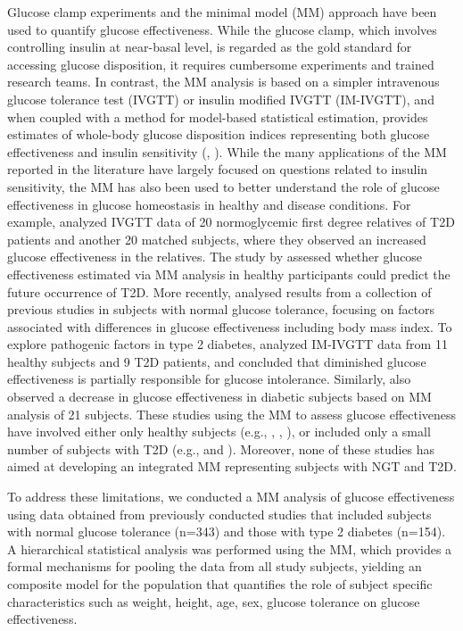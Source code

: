 \documentclass[utf8]{frontiersSCNS} %
\begin{document}
Glucose clamp experiments and the minimal model (MM) approach have been used to quantify glucose effectiveness. While the glucose clamp, which involves controlling insulin at near-basal level, is regarded as the gold standard for accessing glucose disposition, it requires cumbersome experiments and trained research teams. In contrast, the MM analysis is based on a simpler intravenous glucose tolerance test (IVGTT) or insulin modified IVGTT (IM-IVGTT), and when coupled with a method for model-based statistical estimation, provides estimates of whole-body glucose disposition indices representing both glucose effectiveness and insulin sensitivity (\citet{bergman_equ}, \citet{jan_equ}). While the many applications of the MM reported in the literature have largely focused on questions related to insulin sensitivity, the MM has also been used to better understand the role of glucose effectiveness in glucose homeostasis in healthy and disease conditions. For example, \citet{jan_relative} analyzed IVGTT data of 20 normoglycemic first degree relatives of T2D patients and another 20 matched subjects, where they observed an increased glucose effectiveness in the relatives. The study by \cite{lorenzo_2010} assessed whether glucose effectiveness estimated via MM analysis in healthy participants could predict the future occurrence of T2D. More recently, \citet{Morettini_2019} analysed results from a collection of previous studies in subjects with normal glucose tolerance, focusing on factors associated with differences in glucose effectiveness including body mass index. To explore pathogenic factors in type 2 diabetes, \citet{ataru_1992} analyzed IM-IVGTT data from 11 healthy subjects and 9 T2D patients, and concluded that diminished glucose effectiveness is partially responsible for glucose intolerance. Similarly, \citet{welch_1990} also observed a decrease in glucose effectiveness in diabetic subjects based on MM analysis of 21 subjects. These studies using the MM to assess glucose effectiveness have involved either only healthy subjects (e.g., \citet{jan_relative}, \cite{lorenzo_2010}, \citet{Morettini_2019}), or included only a small number of subjects with T2D (e.g., \citet{ataru_1992} and \citet{welch_1990}). Moreover, none of these studies has aimed at developing an integrated MM representing subjects with NGT and T2D.

To address these limitations, we conducted a MM analysis of glucose effectiveness using data obtained from previously conducted studies that included subjects with normal glucose tolerance (n=343) and those with type 2 diabetes (n=154). A hierarchical statistical analysis was performed using the MM, which provides a formal mechanisms for pooling the data from all study subjects, yielding an composite model for the population that quantifies the role of subject specific characteristics such as weight, height, age, sex, glucose tolerance on glucose effectiveness.
\end{document}
